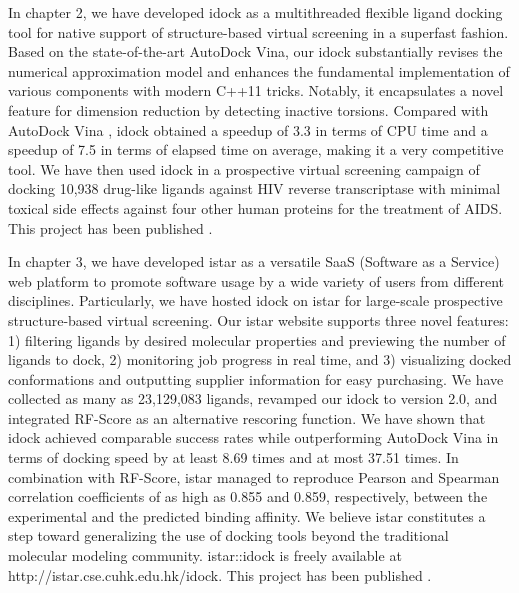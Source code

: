 In chapter 2, we have developed idock \citep{1153} as a multithreaded flexible ligand docking tool for native support of structure-based virtual screening in a superfast fashion. Based on the state-of-the-art AutoDock Vina, our idock substantially revises the numerical approximation model and enhances the fundamental implementation of various components with modern C++11 tricks. Notably, it encapsulates a novel feature for dimension reduction by detecting inactive torsions. Compared with AutoDock Vina \citep{595}, idock obtained a speedup of 3.3 in terms of CPU time and a speedup of 7.5 in terms of elapsed time on average, making it a very competitive tool. We have then used idock in a prospective virtual screening campaign of docking 10,938 drug-like ligands against HIV reverse transcriptase with minimal toxical side effects against four other human proteins for the treatment of AIDS. This project has been published \citep{1153}.

In chapter 3, we have developed istar \citep{1362} as a versatile SaaS (Software as a Service) web platform to promote software usage by a wide variety of users from different disciplines. Particularly, we have hosted idock on istar for large-scale prospective structure-based virtual screening. Our istar website supports three novel features: 1) filtering ligands by desired molecular properties and previewing the number of ligands to dock, 2) monitoring job progress in real time, and 3) visualizing docked conformations and outputting supplier information for easy purchasing. We have collected as many as 23,129,083 ligands, revamped our idock to version 2.0, and integrated RF-Score \citep{564} as an alternative rescoring function. We have shown that idock achieved comparable success rates while outperforming AutoDock Vina in terms of docking speed by at least 8.69 times and at most 37.51 times. In combination with RF-Score, istar managed to reproduce Pearson and Spearman correlation coefficients of as high as 0.855 and 0.859, respectively, between the experimental and the predicted binding affinity. We believe istar constitutes a step toward generalizing the use of docking tools beyond the traditional molecular modeling community. istar::idock is freely available at http://istar.cse.cuhk.edu.hk/idock. This project has been published \citep{1362}.%

